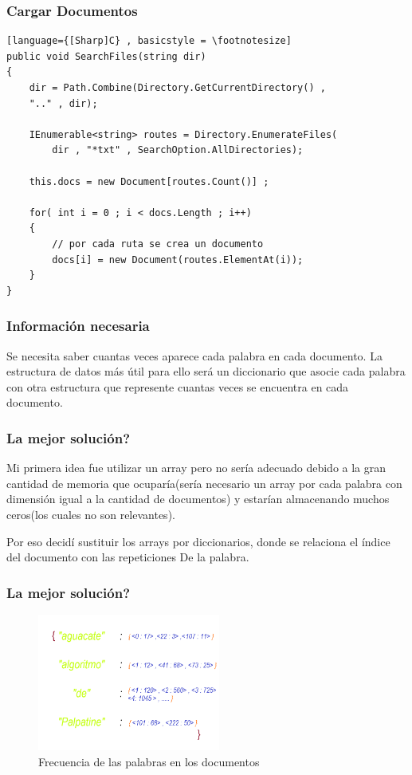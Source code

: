 \documentclass{beamer}
\begin{document}
\begin{frame}[fragile]
    \frametitle{Cargar Documentos}
    \begin{lstlisting}[language={[Sharp]C} , basicstyle = \footnotesize]
public void SearchFiles(string dir)
{            
    dir = Path.Combine(Directory.GetCurrentDirectory() , 
    ".." , dir);
    
    IEnumerable<string> routes = Directory.EnumerateFiles(
        dir , "*txt" , SearchOption.AllDirectories);
                
    this.docs = new Document[routes.Count()] ;
                
    for( int i = 0 ; i < docs.Length ; i++)
    {
        // por cada ruta se crea un documento
        docs[i] = new Document(routes.ElementAt(i));
    }
}    
    \end{lstlisting}         

\end{frame}

\begin{frame}
    \frametitle{Información necesaria}
    Se necesita saber cuantas veces aparece cada palabra en cada documento. La estructura de datos más útil para ello será
    un diccionario que asocie cada palabra con otra estructura que represente cuantas veces se encuentra en cada documento.
\end{frame}

\begin{frame}
    \frametitle{La mejor solución?}
    Mi primera idea fue utilizar un array pero no sería adecuado debido a la gran cantidad de memoria que ocuparía(sería necesario un
    array por cada palabra con dimensión igual a la cantidad de documentos) y estarían almacenando muchos ceros(los cuales no son relevantes).

    Por eso decidí sustituir los arrays por diccionarios, donde se relaciona el índice del documento con las repeticiones De
    la palabra.
\end{frame}

\begin{frame}
    \frametitle{La mejor solución?}
    
    \begin{figure}
        \includegraphics[width = 6cm]{./../images/content.png}
        \caption{Frecuencia de las palabras en los documentos}
    
    \end{figure}
\end{frame}
    
\end{document}
